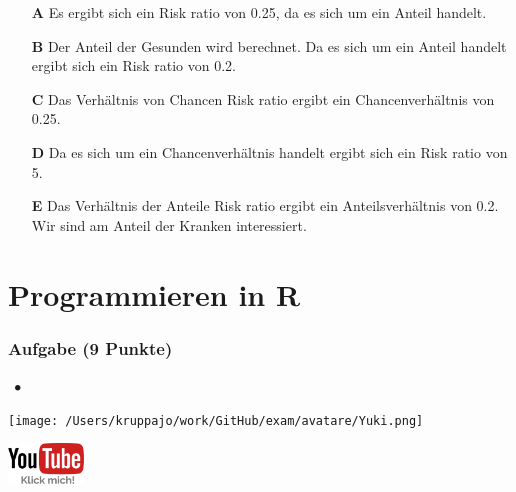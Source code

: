 \documentclass[a4paper, 9pt]{scrartcl}\usepackage[]{graphicx}\usepackage[]{xcolor}
\begin{document}
\begin{enumerate}
\item [\textbf{A} \msquare] Es ergibt sich ein Risk ratio von 0.25, da es sich um ein Anteil handelt.
\item [\textbf{B} \msquare] Der Anteil der Gesunden wird berechnet. Da es sich um ein Anteil handelt ergibt sich ein Risk ratio von 0.2.
\item [\textbf{C} \msquare] Das Verhältnis von Chancen Risk ratio ergibt ein Chancenverhältnis von 0.25.
\item [\textbf{D} \msquare] Da es sich um ein Chancenverhältnis handelt ergibt sich ein Risk ratio von 5.
\item [\textbf{E} \msquare] Das Verhältnis der Anteile Risk ratio ergibt ein Anteilsverhältnis von 0.2. Wir sind am Anteil der Kranken interessiert.
\end{enumerate}
    
\clearpage
\part{Programmieren in R}

\section{Aufgabe \hfill (9 Punkte)}



 
\ifcollection
\begin{flushright}
\tiny\vspace{-3Ex}
\textbf{\examinhaltstart}
\exammodulemathstat $\;\bullet$
\exammodulestat 
\vspace{-4Ex}
\end{flushright}
\begin{minipage}[t]{0.5\textwidth}
\texttt{[image: /Users/kruppajo/work/GitHub/exam/avatare/Yuki.png]}
\end{minipage}
\begin{minipage}[t]{0.5\textwidth}
\hfill
\href{https://www.youtube.com/playlist?list=PLe51bCp9JvEFUnFqaJG5aRmON9i1ZbOYC}{\includegraphics[width = 2cm]{img/youtube}}
\end{minipage}
\vspace{-3ex}
\fi
\end{document}
